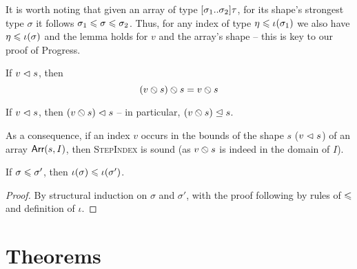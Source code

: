 It is worth noting that given an array of type $\sarraytype{\sigma_1}{\sigma_2}{\tau}$, for its shape's strongest type $\sigma$ it follows $\sigma_1 \leqslant \sigma \leqslant \sigma_2$. Thus, for any index of type $\eta \leqslant \iota(\sigma_1)$ we also have $\eta \leqslant \iota(\sigma)$ and the lemma holds for $v$ and the array's shape -- this is key to our proof of Progress.

\begin{lemma}
    If $v \vartriangleleft s$, then $${({v} \obslash {s})} \obslash {s} = {v} \obslash {s}$$
\end{lemma}

\begin{lemma}
    If $v \vartriangleleft s$, then $({v} \obslash {s}) \vartriangleleft s$ -- in particular, $({v} \obslash {s}) \trianglelefteq s$. 
\end{lemma}
As a consequence, if an index $v$ occurs in the bounds of the shape $s$ ($v \vartriangleleft s$) of an array $\textsf{Arr}(s,I)$, then \textsc{StepIndex} is sound (as ${v} \obslash {s}$ is indeed in the domain of $I$).

\begin{lemma}
    If $\sigma \leqslant \sigma'$, then $\iota(\sigma) \leqslant \iota(\sigma')$.
\end{lemma}
\begin{proof}
    By structural induction on $\sigma$ and $\sigma'$, with the proof following by rules of $\leqslant$ and definition of $\iota$.
\end{proof}

\section*{Theorems}

